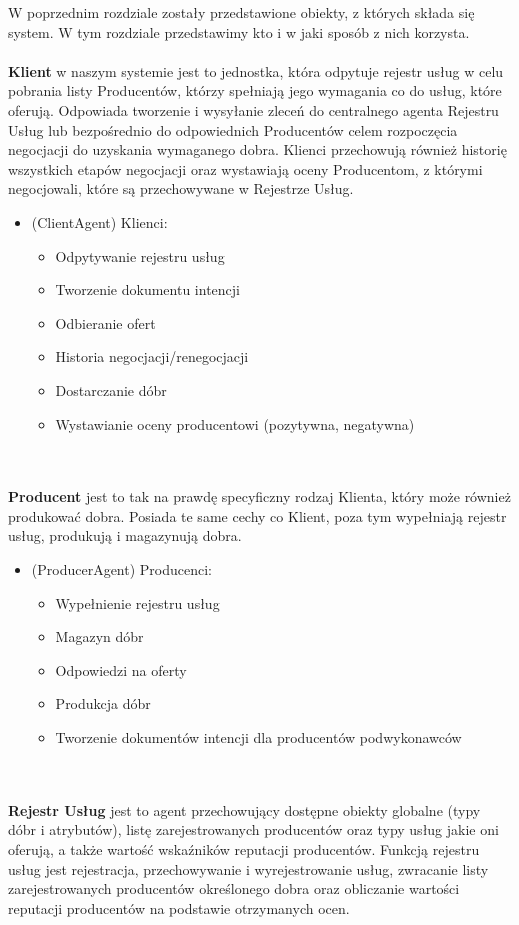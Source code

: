\documentclass[a4paper,12pt]{article}
\begin{document}
W poprzednim rozdziale zostały przedstawione obiekty, z których składa się system. W tym rozdziale przedstawimy kto i w jaki sposób z nich korzysta.
\\ \\
\textbf{Klient} w naszym systemie jest to jednostka, która odpytuje rejestr usług w celu pobrania listy Producentów, którzy spełniają jego wymagania co do usług, które oferują. Odpowiada tworzenie i wysyłanie zleceń do centralnego agenta Rejestru Usług lub bezpośrednio do odpowiednich Producentów celem rozpoczęcia negocjacji do uzyskania wymaganego dobra. Klienci przechowują również historię wszystkich etapów negocjacji oraz wystawiają oceny Producentom, z którymi negocjowali, które są przechowywane w Rejestrze Usług.
\begin{itemize}
\item (ClientAgent) Klienci:
	\begin{itemize}
	\item Odpytywanie rejestru usług
	\item Tworzenie dokumentu intencji
	\item Odbieranie ofert
	\item Historia negocjacji/renegocjacji
	\item Dostarczanie dóbr
	\item Wystawianie oceny producentowi (pozytywna, negatywna)
	\end{itemize}
\end{itemize}
\\ \\
\textbf{Producent} jest to tak na prawdę specyficzny rodzaj Klienta, który może również produkować dobra. Posiada te same cechy co Klient, poza tym wypełniają rejestr usług, produkują i magazynują dobra.
\begin{itemize}
\item (ProducerAgent) Producenci:
	\begin{itemize}
	\item Wypełnienie rejestru usług
	\item Magazyn dóbr
	\item Odpowiedzi na oferty
	\item Produkcja dóbr
	\item Tworzenie dokumentów intencji dla producentów podwykonawców
	\end{itemize}
\end{itemize}
\\ \\
\textbf{Rejestr Usług} jest to agent przechowujący dostępne obiekty globalne (typy dóbr i atrybutów), listę zarejestrowanych producentów oraz typy usług jakie oni oferują, a także wartość wskaźników reputacji producentów. Funkcją rejestru usług jest rejestracja, przechowywanie i wyrejestrowanie usług, zwracanie listy zarejestrowanych producentów określonego dobra oraz obliczanie wartości reputacji producentów na podstawie otrzymanych ocen.
\end{document}
